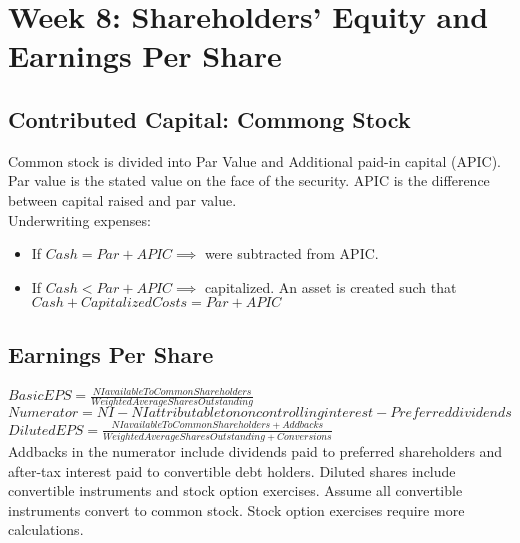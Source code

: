 \section*{Week 8: Shareholders' Equity and Earnings Per Share}

\subsection*{Contributed Capital: Commong Stock}

Common stock is divided into Par Value and Additional paid-in capital (APIC). Par value is the stated value on the face of the security.  APIC is the difference between capital raised and par value. \\
Underwriting expenses:
\begin{itemize}[noitemsep,topsep=0pt]
	\item If $ Cash = Par + APIC \implies $  were subtracted from APIC.
	\item If $ Cash < Par + APIC \implies $ capitalized. An asset is created such that $Cash + Capitalized Costs = Par + APIC$ 
\end{itemize}



\subsection*{Earnings Per Share}

$Basic EPS = \frac{NIavailableToCommonShareholders}{Weighted Average Shares Outstanding}$ \\

$Numerator = NI - NI attributable to noncontrolling interest - Preferred dividends $ \\


$Diluted EPS = \frac{NIavailableToCommonShareholders+Addbacks}{Weighted Average Shares Outstanding+Conversions}$ \\

Addbacks in the numerator include dividends paid to preferred shareholders and after-tax
interest paid to convertible debt holders.
Diluted shares include convertible instruments and stock option exercises. Assume all
convertible instruments convert to common stock. Stock option exercises require more
calculations.